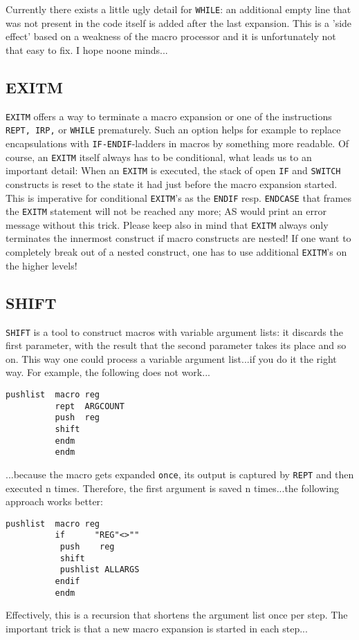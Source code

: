 \documentclass[12pt,twoside]{report}
\makeatletter
\newcommand{\tty}[1]{{\tt #1}}
\newcommand{\ttindex}[1]{\index{#1@{\tt #1}}}
\makeatother
\begin{document}
Currently there exists a little ugly detail for \tty{WHILE}: an additional
empty line that was not present in the code itself is added after the last
expansion.  This is a 'side effect' based on a weakness of the macro
processor and it is unfortunately not that easy to fix.  I hope noone
minds...


\subsection{EXITM}
\ttindex{EXITM}

\tty{EXITM} offers a way to terminate a macro expansion or one of the
instructions \tty{REPT, IRP,} or \tty{WHILE} prematurely.  Such an option
helps for example to replace encapsulations with \tty{IF-ENDIF}-ladders in
macros by something more readable.  Of course, an \tty{EXITM} itself
always has to be conditional, what leads us to an important detail: When
an \tty{EXITM} is executed, the stack of open \tty{IF} and
\tty{SWITCH} constructs is reset to the state it had just before the macro
expansion started.  This is imperative for conditional \tty{EXITM}'s as
the \tty{ENDIF} resp. \tty{ENDCASE} that frames the \tty{EXITM} statement
will not be reached any more; AS would print an error message without this
trick.  Please keep also in mind that \tty{EXITM} always only terminates
the innermost construct if macro constructs are nested!  If one want to
completely break out of a nested construct, one has to use additional
\tty{EXITM}'s on the higher levels!


\subsection{SHIFT}
\ttindex{SHIFT}\ttindex{SHFT}

{\tt SHIFT} is a tool to construct macros with variable argument lists: it
discards the first parameter, with the result that the second parameter
takes its place and so on.  This way one could process a variable argument
list...if you do it the right way.  For example, the following does not
work...
\begin{verbatim}
pushlist  macro reg
          rept  ARGCOUNT
          push  reg
          shift
          endm
          endm
\end{verbatim}
...because the macro gets expanded {\tt once}, its output is captured by
{\tt REPT} and then executed n times.  Therefore, the first argument is
saved n times...the following approach works better:
\begin{verbatim}
pushlist  macro reg
          if      "REG"<>""
           push    reg
           shift
           pushlist ALLARGS
          endif
          endm
\end{verbatim}
Effectively, this is a recursion that shortens the argument list once per
step.  The important trick is that a new macro expansion is started in
each step...
\end{document}
